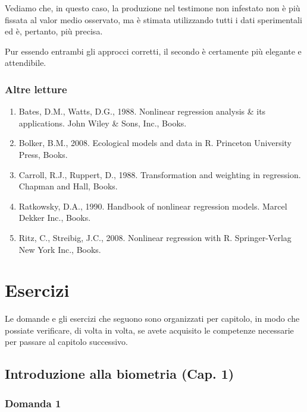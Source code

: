 \documentclass[a4paper,12pt,oneside]{book}
\providecommand{\tightlist}{%
  \setlength{\itemsep}{0pt}\setlength{\parskip}{0pt}}
\begin{document}
Vediamo che, in questo caso, la produzione nel testimone non infestato non è più fissata al valor medio osservato, ma è stimata utilizzando tutti i dati sperimentali ed è, pertanto, più precisa.

Pur essendo entrambi gli approcci corretti, il secondo è certamente più elegante e attendibile.

\hypertarget{altre-letture-11}{%
\subsection{Altre letture}\label{altre-letture-11}}

\begin{enumerate}
\def\labelenumi{\arabic{enumi}.}
\tightlist
\item
  Bates, D.M., Watts, D.G., 1988. Nonlinear regression analysis \& its applications. John Wiley \& Sons, Inc., Books.
\item
  Bolker, B.M., 2008. Ecological models and data in R. Princeton University Press, Books.
\item
  Carroll, R.J., Ruppert, D., 1988. Transformation and weighting in regression. Chapman and Hall, Books.
\item
  Ratkowsky, D.A., 1990. Handbook of nonlinear regression models. Marcel Dekker Inc., Books.
\item
  Ritz, C., Streibig, J.C., 2008. Nonlinear regression with R. Springer-Verlag New York Inc., Books.
\end{enumerate}

\hypertarget{esercizi}{%
\chapter{Esercizi}\label{esercizi}}

Le domande e gli esercizi che seguono sono organizzati per capitolo, in modo che possiate verificare, di volta in volta, se avete acquisito le competenze necessarie per passare al capitolo successivo.

\hypertarget{introduzione-alla-biometria-cap.-1}{%
\section{Introduzione alla biometria (Cap. 1)}\label{introduzione-alla-biometria-cap.-1}}

\hypertarget{domanda-1}{%
\subsection{Domanda 1}\label{domanda-1}}
\end{document}
